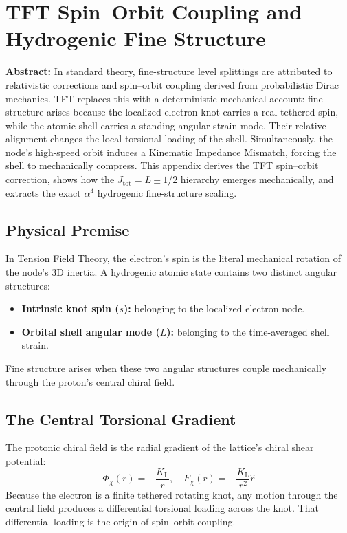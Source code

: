 \chapter{TFT Spin--Orbit Coupling and Hydrogenic Fine Structure}
\label{app:fine_structure}

\noindent\textbf{Abstract:} In standard theory, fine-structure level splittings are attributed to relativistic corrections and spin--orbit coupling derived from probabilistic Dirac mechanics. TFT replaces this with a deterministic mechanical account: fine structure arises because the localized electron knot carries a real tethered spin, while the atomic shell carries a standing angular strain mode. Their relative alignment changes the local torsional loading of the shell. Simultaneously, the node's high-speed orbit induces a Kinematic Impedance Mismatch, forcing the shell to mechanically compress. This appendix derives the TFT spin--orbit correction, shows how the $J_{\mathrm{tot}} = L \pm 1/2$ hierarchy emerges mechanically, and extracts the exact $\alpha^4$ hydrogenic fine-structure scaling.

\section{Physical Premise}
In Tension Field Theory, the electron's spin is the literal mechanical rotation of the node's 3D inertia. A hydrogenic atomic state contains two distinct angular structures:
\begin{itemize}
    \item \textbf{Intrinsic knot spin ($s$):} belonging to the localized electron node.
    \item \textbf{Orbital shell angular mode ($L$):} belonging to the time-averaged shell strain.
\end{itemize}
Fine structure arises when these two angular structures couple mechanically through the proton's central chiral field.

\section{The Central Torsional Gradient}
The protonic chiral field is the radial gradient of the lattice's chiral shear potential:
\begin{equation}
    \Phi_{\chi}(r) = -\frac{K_{\mathrm{L}}}{r}, \quad F_{\chi}(r) = -\frac{K_{\mathrm{L}}}{r^2} \hat{r}
\end{equation}
Because the electron is a finite tethered rotating knot, any motion through the central field produces a differential torsional loading across the knot. That differential loading is the origin of spin--orbit coupling.

